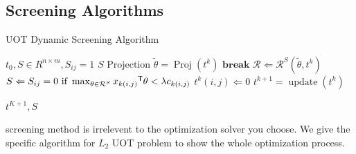 \subsection{Screening Algorithms}

 \begin{algorithm}
 \caption{UOT Dynamic Screening Algorithm}
 \begin{algorithmic}[1]
 \renewcommand{\algorithmicrequire}{\textbf{Input:}}
 \renewcommand{\algorithmicensure}{\textbf{Output:}}
 \REQUIRE $t_0, S \in R^{n\times m}, S_{ij}=1$
 \ENSURE  $S$
  \STATE {}
  \STATE $\text{Projection } \tilde{\theta} = \operatorname{Proj}(t^k)$ 
  \STATE $\textbf{break}$
  \ENDIF
    \STATE $\mathcal{R} \Leftarrow \mathcal{R}^S{(\tilde{\theta},t^k)}$
    \STATE $S \Leftarrow {S_{ij} = 0 \text{ if } \max_{\theta \in \mathcal{R}^S} {x_{k(i,j)}}^{\mathsf T}\theta <\lambda c_{k(i,j)} }$
    \STATE $t^k(i,j) \Leftarrow 0$
    \ENDFOR
    \STATE $t^{k+1} = \operatorname{update}(t^k)$
  \ENDFOR
  
 \RETURN $t^{K+1}, S $ 
 \end{algorithmic} 
 \end{algorithm}

screening method is irrelevent to the optimization solver you choose. We give the specific algorithm for $L_2$ UOT problem to show the whole optimization process.\\











































